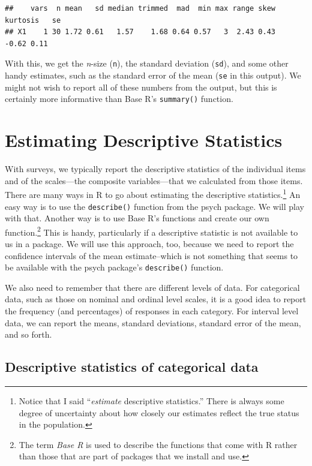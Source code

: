 \documentclass[
]{article}
\begin{document}
\begin{verbatim}
##    vars  n mean   sd median trimmed  mad  min max range skew kurtosis   se
## X1    1 30 1.72 0.61   1.57    1.68 0.64 0.57   3  2.43 0.43    -0.62 0.11
\end{verbatim}

With this, we get the \emph{n}-size (\texttt{n}), the standard deviation (\texttt{sd}), and some other handy estimates, such as the standard error of the mean (\texttt{se} in this output). We might not wish to report all of these numbers from the output, but this is certainly more informative than Base R's \texttt{summary()} function.

\hypertarget{Descripts}{%
\section{Estimating Descriptive Statistics}\label{Descripts}}

With surveys, we typically report the descriptive statistics of the individual items and of the scales---the composite variables---that we calculated from those items. There are many ways in R to go about estimating the descriptive statistics.\footnote{Notice that I said ``\emph{\emph{estimate}} descriptive statistics.'' There is always some degree of uncertainty about how closely our estimates reflect the true status in the population.} An easy way is to use the \texttt{describe()} function from the psych package. We will play with that. Another way is to use Base R's functions and create our own function.\footnote{The term \emph{Base R} is used to describe the functions that come with R rather than those that are part of packages that we install and use.} This is handy, particularly if a descriptive statistic is not available to us in a package. We will use this approach, too, because we need to report the confidence intervals of the mean estimate--which is not something that seems to be available with the psych package's \texttt{describe()} function.

We also need to remember that there are different levels of data. For categorical data, such as those on nominal and ordinal level scales, it is a good idea to report the frequency (and percentages) of responses in each category. For interval level data, we can report the means, standard deviations, standard error of the mean, and so forth.

\hypertarget{descriptive-statistics-of-categorical-data}{%
\subsection{Descriptive statistics of categorical data}\label{descriptive-statistics-of-categorical-data}}
\end{document}
